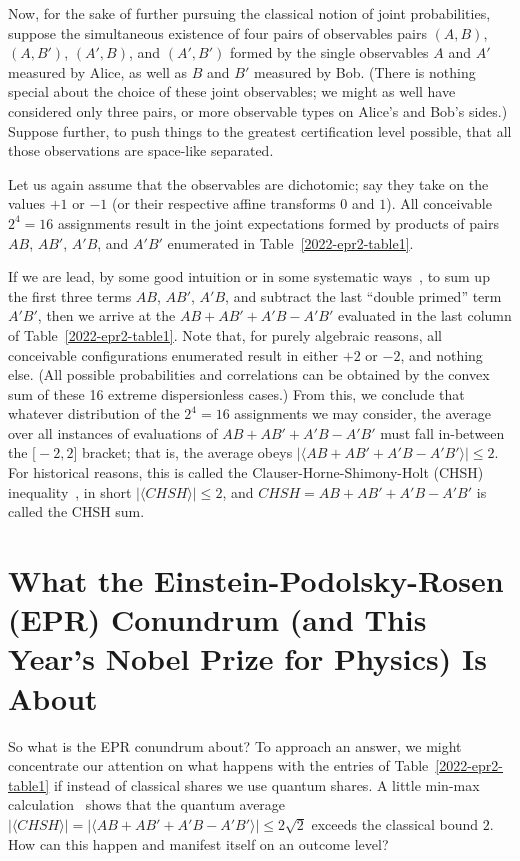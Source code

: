 \documentclass[entropy,article,accept,oneauthor,pdftex]{Definitions/mdpi}
\begin{document}
Now, for the sake of further pursuing the classical notion of joint probabilities,
suppose the simultaneous existence of four pairs of observables pairs
$(A,B)$,
$(A,B')$,
$(A',B)$, and
$(A',B')$
formed by the single observables $A$ and $A'$ measured by Alice, as well as $B$ and $B'$ measured by Bob.
(There is nothing special about the choice of these joint observables; we might as well have considered only three pairs,
or more observable types on Alice's and Bob's sides.)
Suppose further, to push things to the greatest certification level possible, that all those observations are space-like separated.

Let us again assume that the observables are dichotomic; say they take on the values $+1$ or $-1$ (or their respective affine transforms $0$ and $1$).
All conceivable $2^4=16$ assignments result in the joint expectations formed by products of pairs
$AB$,
$AB'$,
$A'B$, and
$A'B'$
enumerated in Table~\ref{2022-epr2-table1}.


If we are lead, by some good intuition or in some systematic ways~\cite{Boole,Boole-62,froissart-81,pitowsky-86,pitowsky-89a},
to sum up the first three terms
$AB$,
$AB'$,
$A'B$,
and subtract the last ``double primed'' term
$A'B'$,
then we arrive at the $AB+AB'+A'B-A'B'$ evaluated in the last column of  Table~\ref{2022-epr2-table1}.
Note that, for purely algebraic reasons, all conceivable configurations enumerated result in either $+2$ or $-2$,
and nothing else.
(All possible probabilities and correlations can be obtained by the convex sum of these 16 extreme dispersionless cases.)
From this, we conclude that whatever distribution of the $2^4=16$ assignments we may consider,
the average over  all instances of evaluations of $AB+AB'+A'B-A'B'$ must fall in-between the $\big[-2,2\big]$ bracket;
that is, the average obeys $\big\vert \langle  AB+AB'+A'B-A'B' \rangle \big\vert \le 2$.
For historical reasons, this is called the Clauser-Horne-Shimony-Holt (CHSH) inequality~\cite{chsh}, in short $\big\vert \langle  CHSH \rangle \big\vert \le 2$,
and $CHSH=AB+AB'+A'B-A'B'$ is called the CHSH sum.




\section{What the Einstein-Podolsky-Rosen (EPR) Conundrum (and This Year’s Nobel Prize for Physics) Is About}

So what is the EPR conundrum about?
To approach an answer, we might concentrate our attention on what happens with the entries of Table~\ref{2022-epr2-table1}
if instead of classical shares we use quantum shares.
A little min-max calculation~\cite{cirelson:87,filipp-svo-04-qpoly-prl} shows that the quantum average
$\big\vert \langle  CHSH \rangle \big\vert=\big\vert \langle  AB+AB'+A'B-A'B' \rangle \big\vert \le 2\sqrt{2}$
exceeds the classical bound $2$.
How can this happen and manifest itself on an outcome level?
\end{document}
